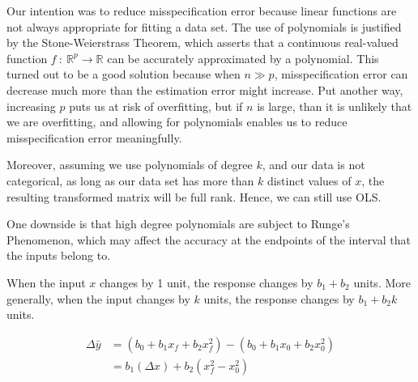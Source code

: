 \documentclass[12pt]{article}
\begin{document}
\begin{enumerate}


Our intention was to reduce misspecification error because linear functions are
not always appropriate for fitting a data set. The use of polynomials is justified
by the Stone-Weierstrass Theorem, which asserts that a continuous real-valued
function $f~:~\mathbb{R}^{p}\to\mathbb{R}$ can be accurately approximated by a polynomial.
This turned out to be a good solution because when $n \gg p$, misspecification
error can decrease much more than the estimation error might increase. Put another
way, increasing $p$ puts us at risk of overfitting, but if $n$ is large,
than it is unlikely that we are overfitting, and allowing for polynomials enables
us to reduce misspecification error meaningfully.

Moreover, assuming we use polynomials of degree $k$, and our data is not
categorical, as long as our data set has more than $k$ distinct values
of $x$, the resulting transformed matrix will be full rank. Hence, we can
still use OLS.

One downside is that high degree polynomials are subject to Runge's Phenomenon, which
may affect the accuracy at the endpoints of the interval that the inputs belong to.


When the input $x$ changes by 1 unit, the response changes by $b_1 + b_2$
units. More generally, when the input changes by $k$ units, the response
changes by $b_1 + b_2k$ units.

\begin{align*}
	\Delta \bar{y}
	&= (b_0 + b_1 x_{f} + b_2 x_{f}^2) - (b_0 + b_1 x_{0} + b_2 x_{0}^2)\\
	&= b_1(\Delta x) + b_2(x_f^2 - x_0^2)
\end{align*}



\end{enumerate}
\end{document}
